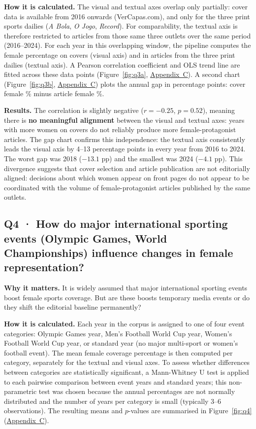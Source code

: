 \documentclass[11pt,a4paper]{article}
\begin{document}
\textbf{How it is calculated.} The visual and textual axes overlap only partially: cover data is available from 2016 onwards (VerCapas.com), and only for the three print sports dailies (\textit{A Bola}, \textit{O Jogo}, \textit{Record}). For comparability, the textual axis is therefore restricted to articles from those same three outlets over the same period (2016--2024). For each year in this overlapping window, the pipeline computes the female percentage on covers (visual axis) and in articles from the three print dailies (textual axis). A Pearson correlation coefficient and OLS trend line are fitted across these data points (Figure~\ref{fig:q3a}, \hyperref[app:figures]{Appendix~C}). A second chart (Figure~\ref{fig:q3b}, \hyperref[app:figures]{Appendix~C}) plots the annual gap in percentage points: cover female \% minus article female \%.

\textbf{Results.} The correlation is slightly negative ($r = -0.25$, $p = 0.52$), meaning there is \textbf{no meaningful alignment} between the visual and textual axes: years with more women on covers do not reliably produce more female-protagonist articles. The gap chart confirms this independence: the textual axis consistently leads the visual axis by 4–13 percentage points in every year from 2016 to 2024. The worst gap was 2018 ($-13.1$ pp) and the smallest was 2024 ($-4.1$ pp). This divergence suggests that cover selection and article publication are not editorially aligned: decisions about which women appear on front pages do not appear to be coordinated with the volume of female-protagonist articles published by the same outlets.

\subsection[Q4 · Influence of major sporting events on female representation]{Q4 · How do major international sporting events (Olympic Games, World Championships) influence changes in female representation?}

\textbf{Why it matters.} It is widely assumed that major international sporting events boost female sports coverage. But are these boosts temporary media events or do they shift the editorial baseline permanently?

\textbf{How it is calculated.} Each year in the corpus is assigned to one of four event categories: Olympic Games year, Men's Football World Cup year, Women's Football World Cup year, or standard year (no major multi-sport or women's football event). The mean female coverage percentage is then computed per category, separately for the textual and visual axes. To assess whether differences between categories are statistically significant, a Mann-Whitney U test is applied to each pairwise comparison between event years and standard years; this non-parametric test was chosen because the annual percentages are not normally distributed and the number of years per category is small (typically 3--6 observations). The resulting means and $p$-values are summarised in Figure~\ref{fig:q4} (\hyperref[app:figures]{Appendix~C}).
\end{document}
